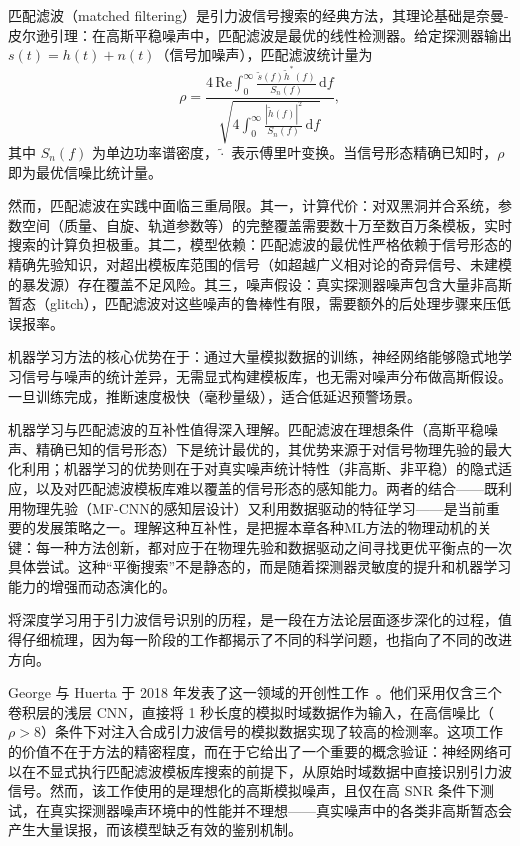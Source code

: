 匹配滤波（matched filtering）是引力波信号搜索的经典方法，其理论基础是奈曼-皮尔逊引理：在高斯平稳噪声中，匹配滤波是最优的线性检测器。给定探测器输出 $s(t) = h(t) + n(t)$（信号加噪声），匹配滤波统计量为
\begin{equation}
  \rho = \frac{4\,\mathrm{Re}\int_0^\infty \frac{\tilde{s}(f)\tilde{h}^*(f)}{S_n(f)}\,\mathrm{d}f}{\sqrt{4\int_0^\infty \frac{|\tilde{h}(f)|^2}{S_n(f)}\,\mathrm{d}f}},
\end{equation}
其中 $S_n(f)$ 为单边功率谱密度，$\tilde{\cdot}$ 表示傅里叶变换。当信号形态精确已知时，$\rho$ 即为最优信噪比统计量。

然而，匹配滤波在实践中面临三重局限。其一，计算代价：对双黑洞并合系统，参数空间（质量、自旋、轨道参数等）的完整覆盖需要数十万至数百万条模板，实时搜索的计算负担极重。其二，模型依赖：匹配滤波的最优性严格依赖于信号形态的精确先验知识，对超出模板库范围的信号（如超越广义相对论的奇异信号、未建模的暴发源）存在覆盖不足风险。其三，噪声假设：真实探测器噪声包含大量非高斯暂态（glitch），匹配滤波对这些噪声的鲁棒性有限，需要额外的后处理步骤来压低误报率。

机器学习方法的核心优势在于：通过大量模拟数据的训练，神经网络能够隐式地学习信号与噪声的统计差异，无需显式构建模板库，也无需对噪声分布做高斯假设。一旦训练完成，推断速度极快（毫秒量级），适合低延迟预警场景。

机器学习与匹配滤波的互补性值得深入理解。匹配滤波在理想条件（高斯平稳噪声、精确已知的信号形态）下是统计最优的，其优势来源于对信号物理先验的最大化利用；机器学习的优势则在于对真实噪声统计特性（非高斯、非平稳）的隐式适应，以及对匹配滤波模板库难以覆盖的信号形态的感知能力。两者的结合——既利用物理先验（MF-CNN的感知层设计）又利用数据驱动的特征学习——是当前重要的发展策略之一。理解这种互补性，是把握本章各种ML方法的物理动机的关键：每一种方法创新，都对应于在物理先验和数据驱动之间寻找更优平衡点的一次具体尝试。这种“平衡搜索”不是静态的，而是随着探测器灵敏度的提升和机器学习能力的增强而动态演化的。

将深度学习用于引力波信号识别的历程，是一段在方法论层面逐步深化的过程，值得仔细梳理，因为每一阶段的工作都揭示了不同的科学问题，也指向了不同的改进方向。

George 与 Huerta 于 2018 年发表了这一领域的开创性工作~\cite{GeorgeHuerta2018}。他们采用仅含三个卷积层的浅层 CNN，直接将 1 秒长度的模拟时域数据作为输入，在高信噪比（$\rho > 8$）条件下对注入合成引力波信号的模拟数据实现了较高的检测率。这项工作的价值不在于方法的精密程度，而在于它给出了一个重要的概念验证：神经网络可以在不显式执行匹配滤波模板库搜索的前提下，从原始时域数据中直接识别引力波信号。然而，该工作使用的是理想化的高斯模拟噪声，且仅在高 SNR 条件下测试，在真实探测器噪声环境中的性能并不理想——真实噪声中的各类非高斯暂态会产生大量误报，而该模型缺乏有效的鉴别机制。

